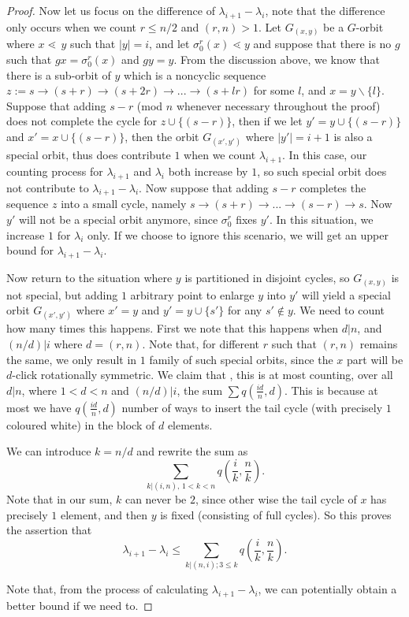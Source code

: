 \documentclass[12pt]{article}
\newcommand{\dstyle}{\displaystyle}
\newcommand{\1}{\mathbb{I}}
\newcommand{\ra}{\rightarrow}
\newcommand{\minus}{\backslash}
\theoremstyle{definition}
\theoremstyle{definition}
\theoremstyle{definition}
\theoremstyle{definition}
\theoremstyle{definition}
\theoremstyle{definition}
\begin{document}
\begin{proof}
Now let us focus on the difference of $\lambda_{i+1} - \lambda_{i}$, note that the difference only occurs when we count $r \le n/2$ and $(r, n) > 1$. Let $G_{(x, y)}$ be a $G$-orbit where $x \lessdot \, y$ such that $|y| = i$, and let $\sigma_0^{r} (x) \lessdot  y$ and suppose that there is no $g$ such that $g x = \sigma_0 ^r (x)$ and $gy = y$. From the discussion above, we know that there is a sub-orbit of $y$ which is a noncyclic sequence $z := s \ra (s+r) \ra (s+2r) \ra ... \ra (s+ lr)$  for some $l $, and $x = y \minus \{l\} $. Suppose that adding $s-r $ (mod $n$ whenever necessary throughout the proof) does not complete the cycle for  $z \cup \{(s - r)\}$, then if we let  $y' = y \cup \{(s - r) \} $ and $x' = x \cup \{(s -r)\}$, then the orbit $G_{(x', y')}$ where $|y'| = i+1$ is also a special orbit, thus does contribute $1$ when we count $\lambda_{i+1}$.  In this case, our counting process for $\lambda_{i+1}$ and $\lambda_{i}$ both increase by $1$, so such special orbit does not contribute to $\lambda_{i+1} - \lambda_{i}$. Now suppose that adding $s -r$ completes the sequence $z$ into a small cycle, namely $s \ra (s+r) \ra ... \ra (s-r) \ra s$. Now $y'$ will not be a special orbit anymore, since $\sigma_0^r $ fixes $y'$. In this situation,  we increase  $1$ for $\lambda_i$ only. If we choose to ignore this scenario, we will get an upper bound for $\lambda_{i+1} - \lambda_i$. 

Now return to the situation where $y$ is partitioned in disjoint cycles, so $G_{(x,y)}$ is not special, but adding $1$ arbitrary point to enlarge $y$ into $y'$ will yield a special orbit $G_{(x', y')}$ where $x' = y$ and $y' = y \cup \{s'\}$ for any $s' \notin y$. We need to count how many times this happens.  First we note that this happens when $d | n$, and $(n/d) | i$ where $d = (r, n)$. Note that, for different $r$ such that $(r, n)$ remains the same, we only result in $1$ family of such special orbits, since the $x$ part will be $d$-click rotationally symmetric. We claim that , this is at most counting,  over all $d | n$, where $1 < d < n$ and $(n/d) | i $, the sum $\dstyle \sum q (\frac{id}{n}, d)$. This is because at most we have $q(\frac{id}{n}, d)$ number of ways to insert the tail cycle (with precisely $1$ coloured white) in the block of $d$ elements. 

We can introduce $k = n/d$  and rewrite the sum as 
$$\sum_{k | (i, n), \, 1 < k < n} q(\frac{i}{k}, \frac{n}{k}).$$ Note that in our sum, $k$ can never be $2$, since other wise the tail cycle of $x$ has precisely $1$ element, and then $y$ is fixed (consisting of full cycles). So this proves the assertion that $$\lambda_{i+1} - \lambda_i \le \sum_{k | (n , i);  3 \le k } q (\frac{i}{k}, \frac{n}{k}). $$ 
 

Note that, from the process of calculating $\lambda_{i+1} - \lambda_{i}$, we can potentially obtain a better bound if we need to. 
\end{proof}
\end{document}
